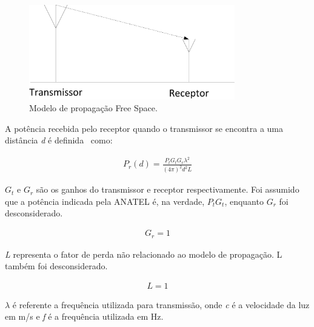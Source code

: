 \begin{figure}[htb]
\centering
\includegraphics[width=0.8\textwidth]{figs/freespaces}
\caption[Modelo de propagação Free Space.]
{Modelo de propagação Free Space.}
\label{fig:freespaces}
\end{figure}

A potência recebida pelo receptor quando o transmissor se encontra a uma distância \textit{d} é definida~\cite{rapapport} como: 

\begin{align}
  \label{potfree} P_r(d) =\frac{ P_tG_tG_r\lambda^{2}}{(4\pi)^{2}d^{2}L}
\end{align}

\begin{math}G_t\end{math} e \begin{math}G_r\end{math} são os ganhos do transmissor e receptor respectivamente. Foi assumido que a potência indicada pela ANATEL é, na verdade, \begin{math}P_tG_t\end{math}, enquanto \begin{math}G_r\end{math} foi desconsiderado.

\begin{align}
  \label{ganho} G_r = 1
\end{align}

\textit{L} representa o fator de perda não relacionado ao modelo de propagação. L também foi desconsiderado.

\begin{align}
  \label{loss} L = 1
\end{align}

\begin{math}\lambda\end{math} é referente a frequência utilizada para transmissão, onde \textit{c} é a velocidade da luz em m/s e \textit{f} é a frequência utilizada em Hz.

